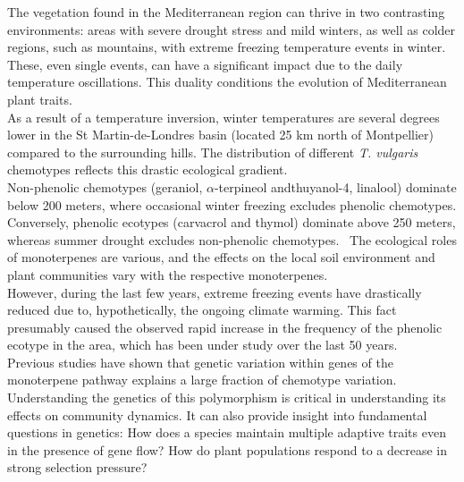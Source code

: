 The vegetation found in the Mediterranean region can thrive in two contrasting environments: areas with severe drought stress and mild winters, as well as colder regions, such as mountains, with extreme freezing temperature events in winter. These, even single events, can have a significant impact due to the daily temperature oscillations. This duality conditions the evolution of Mediterranean plant traits.~\cite{thompsonPlantTraitsEcological2020}\\

As a result of a temperature inversion, winter temperatures are several degrees lower in the St Martin-de-Londres basin (located 25 km north of Montpellier) compared to the surrounding hills. The distribution of different \textit{T. vulgaris} chemotypes reflects this drastic ecological gradient.~\cite{thompsonPlantTraitsEcological2020,bataillonGenotypePhenotypeGenetic2022} \\

Non-phenolic chemotypes (geraniol, $\alpha$-terpineol andthuyanol-4, linalool) dominate below 200 meters, where occasional winter freezing excludes phenolic chemotypes. Conversely, phenolic ecotypes (carvacrol and thymol) dominate above 250 meters, whereas summer drought excludes non-phenolic chemotypes.~\cite{thompsonPlantTraitsEcological2020} The ecological roles of monoterpenes are various, and the effects on the local soil environment and plant communities vary with the respective monoterpenes.~\cite{bataillonGenotypePhenotypeGenetic2022} \\

However, during the last few years, extreme freezing events have drastically reduced due to, hypothetically, the ongoing climate warming. This fact presumably caused the observed rapid increase in the frequency of the phenolic ecotype in the area, which has been under study over the last 50 years.~\cite{thompsonPlantTraitsEcological2020,bataillonGenotypePhenotypeGenetic2022} \\

Previous studies have shown that genetic variation within genes of the monoterpene pathway explains a large fraction of chemotype variation. ~\cite{bataillonGenotypePhenotypeGenetic2022} Understanding the genetics of this polymorphism is critical in understanding its effects on community dynamics. It can also provide insight into fundamental questions in genetics: How does a species maintain multiple adaptive traits even in the presence of gene flow? How do plant populations respond to a decrease in strong selection pressure?~\cite{bataillonGenotypePhenotypeGenetic2022, thompsonPlantTraitsEcological2020}\\

